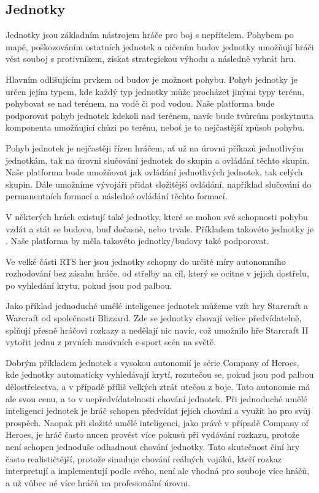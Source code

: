 \subsection{Jednotky}
Jednotky jsou základním nástrojem hráče pro boj s nepřítelem. Pohybem po mapě, poškozováním ostatních jednotek a ničením budov jednotky umožňují hráči vést souboj s protivníkem, získat strategickou výhodu a následně vyhrát hru. 

Hlavním odlišujícím prvkem od budov je možnost pohybu. Pohyb jednotky je určen jejím typem, kde každý typ jednotky může procházet jinými typy terénu, pohybovat se nad terénem, na vodě či pod vodou. Naše platforma bude podporovat pohyb jednotek kdekoli nad terénem, navíc bude tvůrcům poskytnuta komponenta umožňující chůzi po terénu, neboť je to nejčastější způsob pohybu. 

Pohyb jednotek je nejčastěji řízen hráčem, ať už na úrovni příkazů jednotlivým jednotkám, tak na úrovni slučování jednotek do skupin a ovládání těchto skupin. Naše platforma bude umožňovat jak ovládání jednotlivých jednotek, tak celých skupin. Dále umožníme vývojáři přidat složitější ovládání, například slučování do permanentních formací a následné ovládání těchto formací. 

V některých hrách existují také jednotky, které se mohou své schopnosti pohybu vzdát a stát se budovu, buď dočasně, nebo trvale. Příkladem takovéto jednotky je . Naše platforma by měla takovéto jednotky/budovy také podporovat. 

Ve velké části RTS her jsou jednotky schopny do určité míry autonomního rozhodování bez zásahu hráče, od střelby na cíl, který se ocitne v jejich dostřelu, po vyhledání krytu, pokud jsou pod palbou. 

Jako příklad jednoduché umělé inteligence jednotek můžeme vzít hry Starcraft a Warcraft od společnosti Blizzard. Zde se jednotky chovají velice předvídatelně, splňují přesně hráčovi rozkazy a nedělají nic navíc, což umožnilo hře Starcraft II vytořit jednu z prvních masivních e-sport scén na světě. \citep{gamasutra01}

Dobrým příkladem jednotek s vysokou autonomií je série Company of Heroes, kde jednotky automaticky vyhledávají krytí, rozutečou se, pokud jsou pod palbou dělostřelectva, a v případě příliš velkých ztrát utečou z boje. Tato autonomie má ale svou cenu, a to v nepředvídatelnosti chování jednotek. Při jednoduché umělé inteligenci jednotek je hráč schopen předvídat jejich chování a využít ho pro svůj prospěch. Naopak při složité umělé inteligenci, jako právě v případě Company of Heroes, je hráč často nucen provést více pokusů při vydávání rozkazu, protože není schopen jednoduše odhadnout chování jednotky. Tato skutečnost činí hry často realističtější, protože simuluje chování reálných vojáků, kteří rozkaz interpretují a implementují podle svého, není ale vhodná pro souboje více hráčů, a už vůbec né více hráčů na profesionální úrovni.

